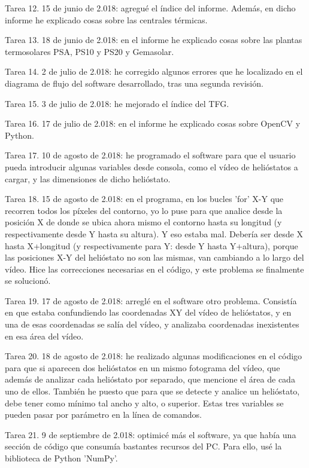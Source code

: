 Tarea 12. 15 de junio de 2.018: agregué el índice del informe. Además, en dicho informe he explicado cosas sobre las centrales térmicas.

Tarea 13. 18 de junio de 2.018: en el informe he explicado cosas sobre las plantas termosolares PSA, PS10 y PS20 y Gemasolar.

Tarea 14. 2 de julio de 2.018: he corregido algunos errores que he localizado en el diagrama de flujo del software desarrollado, tras una segunda revisión.

Tarea 15. 3 de julio de 2.018: he mejorado el índice del TFG.

Tarea 16. 17 de julio de 2.018: en el informe he explicado cosas sobre OpenCV y Python.

Tarea 17. 10 de agosto de 2.018: he programado el software para que el usuario pueda introducir algunas variables desde consola, como el vídeo de helióstatos a cargar, y las dimensiones de dicho helióstato.

Tarea 18. 15 de agosto de 2.018: en el programa, en los bucles 'for' X-Y que recorren todos los píxeles del contorno, yo lo puse para que analice desde la posición X de donde se ubica ahora mismo el contorno hasta su longitud (y respectivamente desde Y hasta su altura). Y eso estaba mal. Debería ser desde X hasta X+longitud (y respectivamente para Y: desde Y hasta Y+altura), porque las posiciones X-Y del helióstato no son las mismas, van cambiando a lo largo del vídeo. Hice las correcciones necesarias en el código, y este problema se finalmente se solucionó.

Tarea 19. 17 de agosto de 2.018: arreglé en el software otro problema. Consistía en que estaba confundiendo las coordenadas XY del vídeo de helióstatos, y en una de esas coordenadas se salía del vídeo, y analizaba coordenadas inexistentes en esa área del vídeo.

Tarea 20. 18 de agosto de 2.018: he realizado algunas modificaciones en el código para que si aparecen dos helióstatos en un mismo fotograma del vídeo, que además de analizar cada helióstato por separado, que mencione el área de cada uno de ellos. También he puesto que para que se detecte y analice un helióstato, debe tener como mínimo tal ancho y alto, o superior. Estas tres variables se pueden pasar por parámetro en la línea de comandos.

Tarea 21. 9 de septiembre de 2.018: optimicé más el software, ya que había una sección de código que consumía bastantes recursos del PC. Para ello, usé la biblioteca de Python 'NumPy'.

